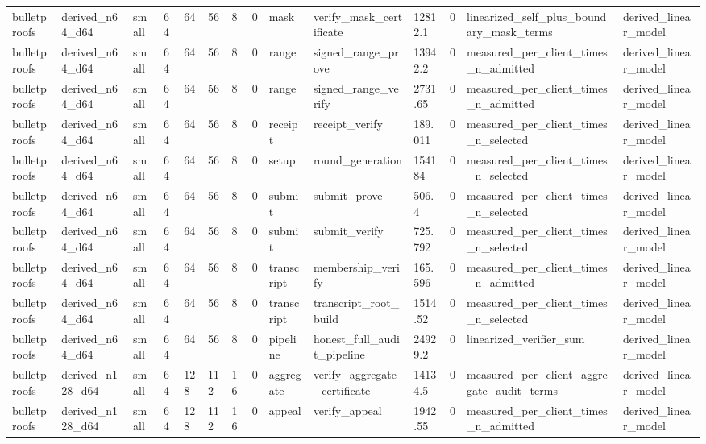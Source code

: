 \begin{table}[t]
\begin{tabular}{llllllllllllll}
bulletproofs & derived\_n64\_d64 & small & 64 & 64 & 56 & 8 & 0 & mask & verify\_mask\_certificate & 12812.1 & 0 & linearized\_self\_plus\_boundary\_mask\_terms & derived\_linear\_model \\
bulletproofs & derived\_n64\_d64 & small & 64 & 64 & 56 & 8 & 0 & range & signed\_range\_prove & 13942.2 & 0 & measured\_per\_client\_times\_n\_admitted & derived\_linear\_model \\
bulletproofs & derived\_n64\_d64 & small & 64 & 64 & 56 & 8 & 0 & range & signed\_range\_verify & 2731.65 & 0 & measured\_per\_client\_times\_n\_admitted & derived\_linear\_model \\
bulletproofs & derived\_n64\_d64 & small & 64 & 64 & 56 & 8 & 0 & receipt & receipt\_verify & 189.011 & 0 & measured\_per\_client\_times\_n\_selected & derived\_linear\_model \\
bulletproofs & derived\_n64\_d64 & small & 64 & 64 & 56 & 8 & 0 & setup & round\_generation & 154184 & 0 & measured\_per\_client\_times\_n\_selected & derived\_linear\_model \\
bulletproofs & derived\_n64\_d64 & small & 64 & 64 & 56 & 8 & 0 & submit & submit\_prove & 506.4 & 0 & measured\_per\_client\_times\_n\_selected & derived\_linear\_model \\
bulletproofs & derived\_n64\_d64 & small & 64 & 64 & 56 & 8 & 0 & submit & submit\_verify & 725.792 & 0 & measured\_per\_client\_times\_n\_selected & derived\_linear\_model \\
bulletproofs & derived\_n64\_d64 & small & 64 & 64 & 56 & 8 & 0 & transcript & membership\_verify & 165.596 & 0 & measured\_per\_client\_times\_n\_admitted & derived\_linear\_model \\
bulletproofs & derived\_n64\_d64 & small & 64 & 64 & 56 & 8 & 0 & transcript & transcript\_root\_build & 1514.52 & 0 & measured\_per\_client\_times\_n\_selected & derived\_linear\_model \\
bulletproofs & derived\_n64\_d64 & small & 64 & 64 & 56 & 8 & 0 & pipeline & honest\_full\_audit\_pipeline & 24929.2 & 0 & linearized\_verifier\_sum & derived\_linear\_model \\
bulletproofs & derived\_n128\_d64 & small & 64 & 128 & 112 & 16 & 0 & aggregate & verify\_aggregate\_certificate & 14134.5 & 0 & measured\_per\_client\_aggregate\_audit\_terms & derived\_linear\_model \\
bulletproofs & derived\_n128\_d64 & small & 64 & 128 & 112 & 16 & 0 & appeal & verify\_appeal & 1942.55 & 0 & measured\_per\_client\_times\_n\_admitted & derived\_linear\_model \\

\end{tabular}
\end{table}
